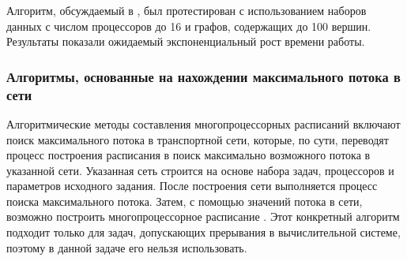 Алгоритм, обсуждаемый в \cite{Rahman2009BranchAB}, был протестирован с использованием наборов данных с числом процессоров до 16 и графов, содержащих до 100 вершин. Результаты показали ожидаемый экспоненциальный рост времени работы.

\subsubsection{Алгоритмы, основанные на нахождении максимального потока в сети}

Алгоритмические методы составления многопроцессорных расписаний включают поиск максимального потока в транспортной сети, которые, по сути, переводят процесс построения расписания в поиск максимально возможного потока в указанной сети. Указанная сеть строится на основе набора задач, процессоров и параметров исходного задания. После построения сети выполняется процесс поиска максимального потока. Затем, с помощью значений потока в сети, возможно построить многопроцессорное расписание \cite{MAGIROU1989351}. Этот конкретный алгоритм подходит только для задач, допускающих прерывания в вычислительной системе, поэтому в данной задаче его нельзя использовать.






